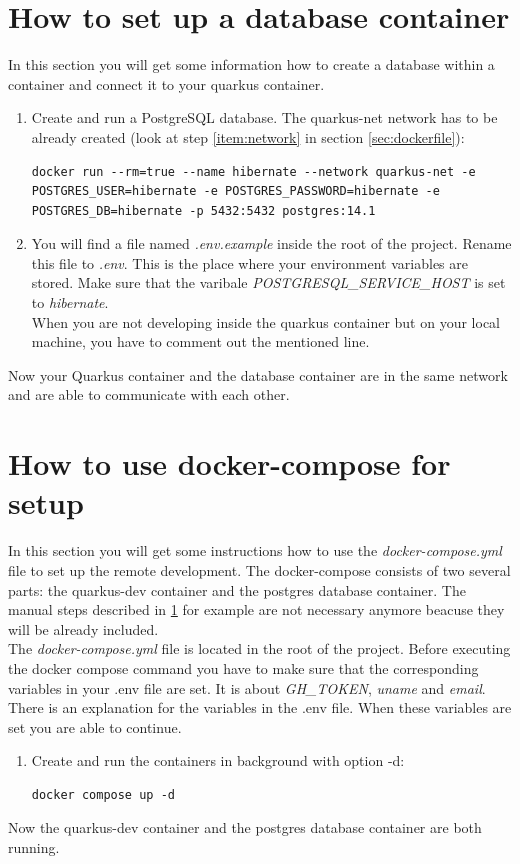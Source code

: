     \section{How to set up a database container}\label{sec:database}
        In this section you will get some information how to create a database within a container and connect it to your quarkus container.  
        \begin{enumerate}
            \item Create and run a PostgreSQL database. The quarkus-net network has to be already created (look at step \ref{item:network} in section \ref{sec:dockerfile}):
            \begin{lstlisting}[style=bash]
docker run --rm=true --name hibernate --network quarkus-net -e POSTGRES_USER=hibernate -e POSTGRES_PASSWORD=hibernate -e POSTGRES_DB=hibernate -p 5432:5432 postgres:14.1
            \end{lstlisting}
            \item You will find a file named \textit{.env.example} inside the root of the project. Rename this file to \textit{.env}. This is the place where your environment variables are stored. Make sure that the varibale \textit{POSTGRESQL\_SERVICE\_HOST} is set to \textit{hibernate}. \\
            When you are not developing inside the quarkus container but on your local machine, you have to comment out the mentioned line. 
        \end{enumerate}
        Now your Quarkus container and the database container are in the same network and are able to communicate with each other. 
    
    \section{How to use docker-compose for setup}\label{sec:docker-compose}
        In this section you will get some instructions how to use the \textit{docker-compose.yml} file to set up the remote development. The docker-compose consists of two several parts: the quarkus-dev container and the postgres database container. The manual steps described in \ref{sec:database} for example are not necessary anymore beacuse they will be already included. \\
        The \textit{docker-compose.yml} file is located in the root of the project. Before executing the docker compose command you have to make sure that the corresponding variables in your .env file are set. It is about \textit{GH\_TOKEN}, \textit{uname} and \textit{email}. There is an explanation for the variables in the .env file. When these variables are set you are able to continue.
        \begin{enumerate}
            \item Create and run the containers in background with option -d:
            \begin{lstlisting}[style=bash]
docker compose up -d
            \end{lstlisting}
        \end{enumerate}
        Now the quarkus-dev container and the postgres database container are both running. 
            
